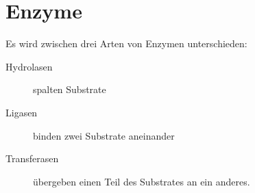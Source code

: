 \documentclass{article}
\begin{document}
\section{Enzyme}
Es wird zwischen drei Arten von Enzymen unterschieden:
\begin{description}
 \item[Hydrolasen] spalten Substrate
 \item[Ligasen] binden zwei Substrate aneinander
 \item[Transferasen] übergeben einen Teil des Substrates an ein anderes.
\end{description} 
\end{document}
